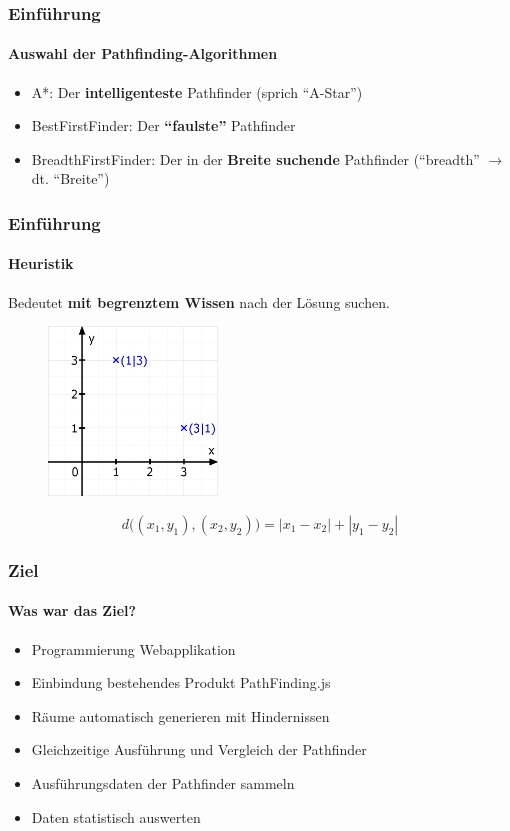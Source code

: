 \documentclass[professionalfont,serif,german]{beamer}
\begin{document}
\begin{frame}
  \frametitle{Einführung}
  \framesubtitle{Auswahl der Pathfinding-Algorithmen}
  \begin{itemize}
    \item \textcolor{pfblue}{A*}: Der \textbf{intelligenteste} Pathfinder (sprich ``A-Star'')
    \item \textcolor{pfred}{BestFirstFinder}: Der \textbf{``faulste''} Pathfinder
    \item \textcolor{pfgreen}{BreadthFirstFinder}: Der in der \textbf{Breite suchende} Pathfinder (``breadth'' $\rightarrow$ dt. ``Breite'')
  \end{itemize}
\end{frame}

\begin{frame}
  \frametitle{Einführung}
  \framesubtitle{Heuristik}
  Bedeutet \textbf{mit begrenztem Wissen} nach der Lösung suchen.
  \begin{figure}
    \centering
    \includegraphics[height=4.5cm]{img/mathegrafix.jpg}
  \end{figure}
  \begin{equation*}
    d\big((x_1,y_1),(x_2,y_2)\big) = |x_1 - x_{2}| + |y_{1} - y_{2}|
  \end{equation*}
\end{frame}

\begin{frame}
  \frametitle{Ziel}
  \framesubtitle{Was war das Ziel?}
  \begin{itemize}
    \item Programmierung Webapplikation
    \item Einbindung bestehendes Produkt PathFinding.js
    \item Räume automatisch generieren mit Hindernissen
    \item Gleichzeitige Ausführung und Vergleich der Pathfinder
    \item Ausführungsdaten der Pathfinder sammeln
    \item Daten statistisch auswerten
  \end{itemize}
\end{frame}
\end{document}
